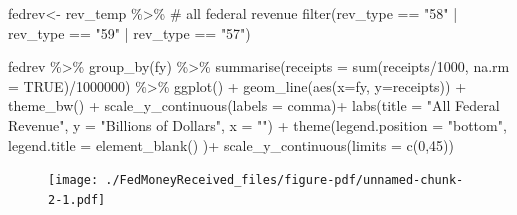 \documentclass[
  letterpaper,
  DIV=11,
  numbers=noendperiod]{scrreport}
\newenvironment{Shaded}{\begin{snugshade}}{\end{snugshade}}
\newcommand{\AttributeTok}[1]{\textcolor[rgb]{0.40,0.45,0.13}{#1}}
\newcommand{\CommentTok}[1]{\textcolor[rgb]{0.37,0.37,0.37}{#1}}
\newcommand{\ConstantTok}[1]{\textcolor[rgb]{0.56,0.35,0.01}{#1}}
\newcommand{\DecValTok}[1]{\textcolor[rgb]{0.68,0.00,0.00}{#1}}
\newcommand{\FunctionTok}[1]{\textcolor[rgb]{0.28,0.35,0.67}{#1}}
\newcommand{\NormalTok}[1]{\textcolor[rgb]{0.00,0.23,0.31}{#1}}
\newcommand{\OtherTok}[1]{\textcolor[rgb]{0.00,0.23,0.31}{#1}}
\newcommand{\SpecialCharTok}[1]{\textcolor[rgb]{0.37,0.37,0.37}{#1}}
\newcommand{\StringTok}[1]{\textcolor[rgb]{0.13,0.47,0.30}{#1}}
\begin{document}
\begin{Shaded}
\begin{Highlighting}[]
\NormalTok{fedrev}\OtherTok{\textless{}{-}}\NormalTok{ rev\_temp }\SpecialCharTok{\%\textgreater{}\%} 
  \CommentTok{\# all federal revenue}
  \FunctionTok{filter}\NormalTok{(rev\_type }\SpecialCharTok{==} \StringTok{"58"} \SpecialCharTok{|}\NormalTok{ rev\_type }\SpecialCharTok{==} \StringTok{"59"} \SpecialCharTok{|}\NormalTok{ rev\_type }\SpecialCharTok{==} \StringTok{"57"}\NormalTok{) }

\NormalTok{fedrev }\SpecialCharTok{\%\textgreater{}\%} 
  \FunctionTok{group\_by}\NormalTok{(fy) }\SpecialCharTok{\%\textgreater{}\%} 
  \FunctionTok{summarise}\NormalTok{(}\AttributeTok{receipts =} \FunctionTok{sum}\NormalTok{(receipts}\SpecialCharTok{/}\DecValTok{1000}\NormalTok{, }\AttributeTok{na.rm =} \ConstantTok{TRUE}\NormalTok{)}\SpecialCharTok{/}\DecValTok{1000000}\NormalTok{) }\SpecialCharTok{\%\textgreater{}\%} 
  \FunctionTok{ggplot}\NormalTok{() }\SpecialCharTok{+}
  \FunctionTok{geom\_line}\NormalTok{(}\FunctionTok{aes}\NormalTok{(}\AttributeTok{x=}\NormalTok{fy, }\AttributeTok{y=}\NormalTok{receipts)) }\SpecialCharTok{+}
      \FunctionTok{theme\_bw}\NormalTok{() }\SpecialCharTok{+}
  \FunctionTok{scale\_y\_continuous}\NormalTok{(}\AttributeTok{labels =}\NormalTok{ comma)}\SpecialCharTok{+}
  \FunctionTok{labs}\NormalTok{(}\AttributeTok{title =} \StringTok{"All Federal Revenue"}\NormalTok{, }
       \AttributeTok{y =} \StringTok{"Billions of Dollars"}\NormalTok{, }\AttributeTok{x =} \StringTok{""}\NormalTok{) }\SpecialCharTok{+} 
  \FunctionTok{theme}\NormalTok{(}\AttributeTok{legend.position =} \StringTok{"bottom"}\NormalTok{, }\AttributeTok{legend.title =} \FunctionTok{element\_blank}\NormalTok{()  )}\SpecialCharTok{+}
    \FunctionTok{scale\_y\_continuous}\NormalTok{(}\AttributeTok{limits =} \FunctionTok{c}\NormalTok{(}\DecValTok{0}\NormalTok{,}\DecValTok{45}\NormalTok{))}
\end{Highlighting}
\end{Shaded}

\begin{figure}[H]

{\centering \texttt{[image: ./FedMoneyReceived\_files/figure-pdf/unnamed-chunk-2-1.pdf]}

}

\end{figure}
\end{document}
